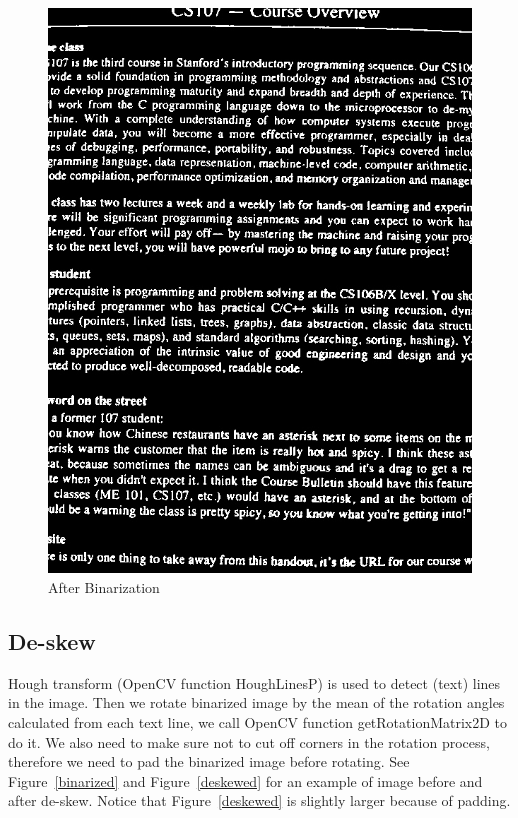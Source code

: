\documentclass[conference]{IEEEtran}
\begin{document}
\begin{figure}
\center
\includegraphics[scale=0.25]{no_skew_binarized.jpg}
\caption{After Binarization}
\label{noskewbinarized}
\end{figure}

\subsection{De-skew}

Hough transform (OpenCV function HoughLinesP) is used to detect (text) lines in the image.  Then we rotate binarized image by the mean of the rotation angles calculated from each text line, we call OpenCV function getRotationMatrix2D to do it.  We also need to make sure not to cut off corners in the rotation process, therefore we need to pad the binarized image before rotating.  See Figure~\ref{binarized} and Figure~\ref{deskewed} for an example of image before and after de-skew.  Notice that Figure~\ref{deskewed} is slightly larger because of padding.
\end{document}
